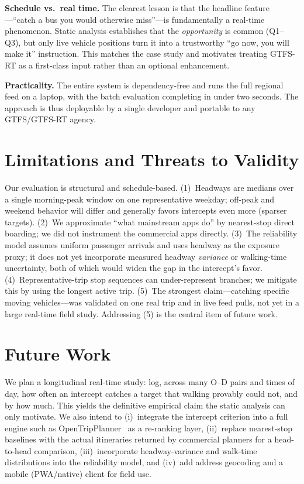 \documentclass[conference]{IEEEtran}
\begin{document}
\textbf{Schedule vs.\ real time.} The clearest lesson is that the headline
feature---``catch a bus you would otherwise miss''---is fundamentally a real-time
phenomenon. Static analysis establishes that the \emph{opportunity} is common
(Q1--Q3), but only live vehicle positions turn it into a trustworthy ``go now,
you will make it'' instruction. This matches the case study and motivates
treating GTFS-RT as a first-class input rather than an optional enhancement.

\textbf{Practicality.} The entire system is dependency-free and runs the full
regional feed on a laptop, with the batch evaluation completing in under two
seconds. The approach is thus deployable by a single developer and portable to
any GTFS/GTFS-RT agency.

\section{Limitations and Threats to Validity}
\label{sec:limits}
Our evaluation is structural and schedule-based. (1)~Headways are medians over a
single morning-peak window on one representative weekday; off-peak and weekend
behavior will differ and generally favors intercepts even more (sparser targets).
(2)~We approximate ``what mainstream apps do'' by nearest-stop direct boarding;
we did not instrument the commercial apps directly. (3)~The reliability model
assumes uniform passenger arrivals and uses headway as the exposure proxy; it does
not yet incorporate measured headway \emph{variance} or walking-time uncertainty,
both of which would widen the gap in the intercept's favor. (4)~Representative-trip
stop sequences can under-represent branches; we mitigate this by using the longest
active trip. (5)~The strongest claim---catching specific moving vehicles---was
validated on one real trip and in live feed pulls, not yet in a large real-time
field study. Addressing (5) is the central item of future work.

\section{Future Work}
We plan a longitudinal real-time study: log, across many O--D pairs and times of
day, how often an intercept catches a target that walking provably could not, and
by how much. This yields the definitive empirical claim the static analysis can
only motivate. We also intend to (i)~integrate the intercept criterion into a
full engine such as OpenTripPlanner~\cite{otp} as a re-ranking layer,
(ii)~replace nearest-stop baselines with the actual itineraries returned by
commercial planners for a head-to-head comparison, (iii)~incorporate
headway-variance and walk-time distributions into the reliability model, and
(iv)~add address geocoding and a mobile (PWA/native) client for field use.
\end{document}
